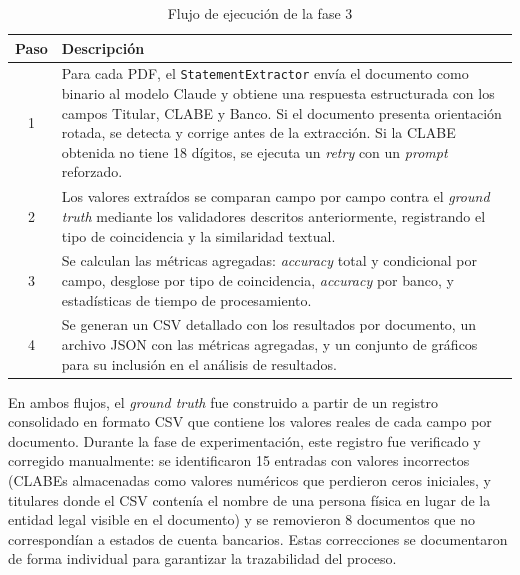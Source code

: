 \begin{table}[H]
\centering
\vspace{6pt}
\begin{tabular}{c p{11cm}}
\toprule
\textbf{Paso} & \textbf{Descripción} \\
\midrule
1 & Para cada PDF, el \texttt{StatementExtractor} envía el documento como binario al modelo Claude y obtiene una respuesta estructurada con los campos Titular, CLABE y Banco. Si el
documento presenta orientación rotada, se detecta y corrige antes de la extracción. Si la CLABE obtenida no tiene 18 dígitos, se ejecuta un \textit{retry} con un \textit{prompt} reforzado.
\\
2 & Los valores extraídos se comparan campo por campo contra el \textit{ground truth} mediante los validadores descritos anteriormente, registrando el tipo de coincidencia y la similaridad
textual. \\
3 & Se calculan las métricas agregadas: \textit{accuracy} total y condicional por campo, desglose por tipo de coincidencia, \textit{accuracy} por banco, y estadísticas de tiempo de
procesamiento. \\
4 & Se generan un CSV detallado con los resultados por documento, un archivo JSON con las métricas agregadas, y un conjunto de gráficos para su inclusión en el análisis de resultados. \\
\bottomrule
\end{tabular}
\caption{Flujo de ejecución de la fase 3}
\label{tab:flujo-fase3}
\end{table}

En ambos flujos, el \textit{ground truth} fue construido a partir de un registro consolidado en formato CSV que contiene los valores reales de cada campo por documento. Durante la fase de experimentación, este registro fue verificado y corregido manualmente: se identificaron 15 entradas con valores incorrectos (CLABEs almacenadas como valores numéricos que perdieron ceros iniciales, y titulares donde el CSV contenía el nombre de una persona física en lugar de la entidad legal visible en el documento) y se removieron 8 documentos que no correspondían a estados de cuenta bancarios. Estas correcciones se documentaron de forma individual para garantizar la trazabilidad del proceso.


